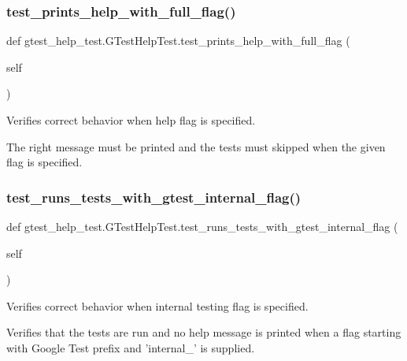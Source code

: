 \subsubsection{\texorpdfstring{test\+\_\+prints\+\_\+help\+\_\+with\+\_\+full\+\_\+flag()}{test\_prints\_help\_with\_full\_flag()}}
{\footnotesize\ttfamily def gtest\+\_\+help\+\_\+test.\+G\+Test\+Help\+Test.\+test\+\_\+prints\+\_\+help\+\_\+with\+\_\+full\+\_\+flag (\begin{DoxyParamCaption}\item[{}]{self }\end{DoxyParamCaption})}

\begin{DoxyVerb}Verifies correct behavior when help flag is specified.

The right message must be printed and the tests must
skipped when the given flag is specified.
\end{DoxyVerb}
 \mbox{\label{classgtest__help__test_1_1GTestHelpTest_ad15939700d2896b93127c78b6b0d7655}} 
\subsubsection{\texorpdfstring{test\+\_\+runs\+\_\+tests\+\_\+with\+\_\+gtest\+\_\+internal\+\_\+flag()}{test\_runs\_tests\_with\_gtest\_internal\_flag()}}
{\footnotesize\ttfamily def gtest\+\_\+help\+\_\+test.\+G\+Test\+Help\+Test.\+test\+\_\+runs\+\_\+tests\+\_\+with\+\_\+gtest\+\_\+internal\+\_\+flag (\begin{DoxyParamCaption}\item[{}]{self }\end{DoxyParamCaption})}

\begin{DoxyVerb}Verifies correct behavior when internal testing flag is specified.

Verifies that the tests are run and no help message is printed when
a flag starting with Google Test prefix and 'internal_' is supplied.
\end{DoxyVerb}
 \mbox{\label{classgtest__help__test_1_1GTestHelpTest_a1f9a5c73e25e66f9b8bf42f7dee11be9}} 
